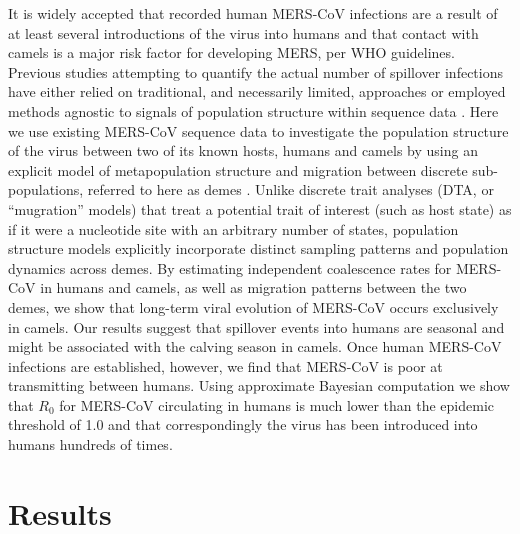 \documentclass[11pt,oneside,letterpaper]{article}
\begin{document}
It is widely accepted that recorded human MERS-CoV infections are a result of at least several introductions of the virus into humans \citep{cotten_2013} and that contact with camels is a major risk factor for developing MERS, per WHO guidelines.
Previous studies attempting to quantify the actual number of spillover infections have either relied on traditional, and necessarily limited, approaches \citep{cauchemez_unraveling_2016} or employed methods agnostic to signals of population structure within sequence data \citep{zhang_evolutionary_2016}.
Here we use existing MERS-CoV sequence data to investigate the population structure of the virus between two of its known hosts, humans and camels by using an explicit model of metapopulation structure and migration between discrete sub-populations, referred to here as demes \citep{vaughan_efficient_2014}.
Unlike discrete trait analyses (DTA, or ``mugration'' models) that treat a potential trait of interest (such as host state) as if it were a nucleotide site with an arbitrary number of states, population structure models explicitly incorporate distinct sampling patterns and population dynamics across demes.
By estimating independent coalescence rates for MERS-CoV in humans and camels, as well as migration patterns between the two demes, we show that long-term viral evolution of MERS-CoV occurs exclusively in camels.
Our results suggest that spillover events into humans are seasonal and might be associated with the calving season in camels.
Once human MERS-CoV infections are established, however, we find that MERS-CoV is poor at transmitting between humans.
Using approximate Bayesian computation we show that $R_{0}$ for MERS-CoV circulating in humans is much lower than the epidemic threshold of 1.0 and that correspondingly the virus has been introduced into humans hundreds of times.

%

\section*{Results}
\end{document}
